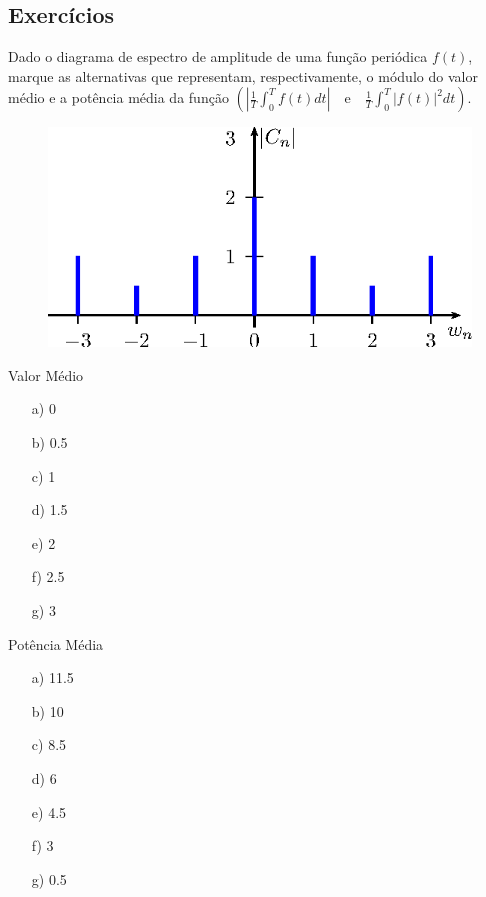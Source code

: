 \subsection*{Exercícios}
\begin{exer}Dado o diagrama de espectro de amplitude de uma função periódica $f(t)$, marque as alternativas que representam, respectivamente, o módulo do valor médio e a potência média da função $\left(\left|\frac{1}{T}\int_0^Tf(t)dt\right|\quad\text{e}\quad \frac{1}{T}\int_0^T|f(t)|^2dt\right)$.\\
\begin{figure}[!ht]
\begin{center}
\includegraphics{cap_propriedades_series/pics/figura_4}
\end{center}
\end{figure}

\begin{minipage}{8cm}
{Valor Médio}
 \begin{itemize}
 \item[a)] 0
 \item[b)] 0.5
 \item[c)] 1
 \item[d)] 1.5
 \item[e)] 2 %
 \item[f)] 2.5
 \item[g)] 3
 \end{itemize}
\end{minipage}
\begin{minipage}{8cm}
{Potência Média}
 \begin{itemize}
\item[a)]  11.5
 \item[b)] 10
 \item[c)] 8.5 %
 \item[d)] 6
 \item[e)] 4.5
 \item[f)] 3
 \item[g)] 0.5
 \end{itemize}
\end{minipage}
\end{exer}
